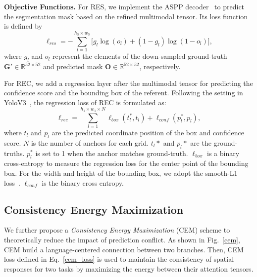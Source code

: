 \documentclass[10pt,twocolumn,letterpaper]{article}
\begin{document}
\textbf{Objective Functions.}
For RES,  we implement the ASPP decoder~\cite{DEEPLAB} to predict the segmentation mask based on the refined multimodal tensor. Its loss function is defined by
\begin{equation}
\ell_{res}=-\sum_{l=1}^{h_3 \times w_3}\big[g_l {\log}\left(o_l\right)+\left(1-g_l\right)\log\left(1-o_l\right)\big], 
\end{equation}
where $g_l$ and $o_l$ represent the elements of the down-sampled   ground-truth $\mathbf{G'} \in \mathbb{R}^{52 \times 52}$ and  predicted mask $\mathbf{O} \in \mathbb{R}^{52 \times 52}$,  respectively. 


For REC, we add a regression layer after the multimodal tensor for predicting the confidence score and the bounding box of the referent. 
Following the setting in YoloV3~\cite{redmon2018yolov3:}, the regression loss of REC is formulated as:
\begin{equation}
\ell_{rec}=\sum_{l=1}^{h_1 \times w_1 \times N} \ell_{box}\left(t_l^*,t_l\right)+\ell_{conf}\left(p_l^*,p_l\right), 
\label{6}
\end{equation}
where $t_l$ and  $p_l$ are the predicted  coordinate position of the  box and confidence score. $N$ is the number of anchors for each grid.  $t_l*$ and $p_l*$ are the ground-truths.   $p_l^*$ is set to 1 when the anchor  matches  ground-truth.  $\ell_{box}$ is a  binary cross-entropy to measure the regression loss for the center point of the bounding box. For the width and height of the bounding box, we adopt the smooth-L1 loss~\cite{ren2017faster}.  $\ell_{conf}$ is the binary cross entropy.

\subsection{Consistency Energy Maximization}
We further propose a \emph{Consistency Energy Maximization} (CEM) scheme  to theoretically reduce the impact of prediction conflict.
As shown in Fig.~\ref{cem},  CEM build  a language-centered connection between two branches. Then, CEM loss defined in Eq.~\ref{cem_loss} is used to maintain the consistency of  spatial responses  for two tasks by maximizing the energy between their  attention tensors. 
\end{document}
